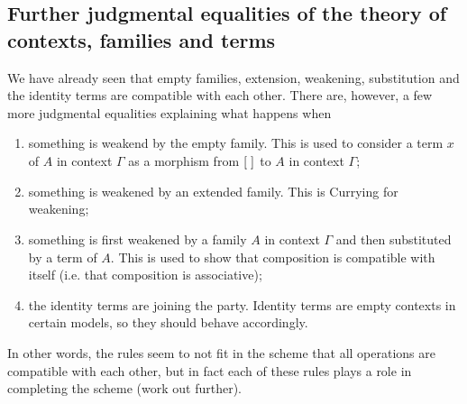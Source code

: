 \subsection{Further judgmental equalities of the theory of contexts, families and
terms}
We have already seen that empty families, extension, weakening, substitution
and the identity terms are compatible with each other. There are, however, a
few more judgmental equalities explaining what happens when
\begin{enumerate}
\item something is weakend by the empty family. This is used to consider a term
      $x$ of $A$ in context $\Gamma$ as a morphism from ${[\;]}_{}$ to $A$ in
      context $\Gamma$;
\item something is weakened by an extended family. This is Currying for weakening;
\item something is first weakened by a family $A$ in context $\Gamma$ and then
      substituted by a term of $A$. This is used to show that composition is
      compatible with itself (i.e. that composition is associative);
\item the identity terms are joining the party. Identity terms are empty contexts
      in certain models, so they should behave accordingly.
\end{enumerate}
In other words, the rules seem to not fit in the scheme that all operations are
compatible with each other, but in fact each of these rules plays a role in
completing the scheme (work out further).

